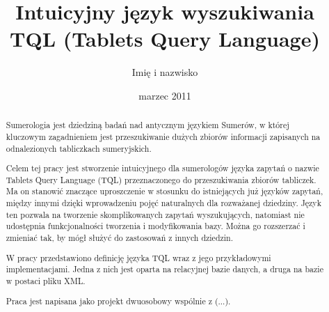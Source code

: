 \documentclass{pracamgr}
\author{Imię i nazwisko}
\title{Intuicyjny język wyszukiwania TQL (Tablets Query Language)}
\date{marzec 2011}
\begin{document}
\maketitle

\begin{abstract}
Sumerologia jest dziedziną badań nad antycznym językiem Sumerów, w której
kluczowym zagadnieniem jest przeszukiwanie dużych zbiorów informacji
zapisanych na odnalezionych tabliczkach sumeryjskich.

Celem tej pracy jest stworzenie intuicyjnego dla sumerologów języka zapytań o nazwie Tablets Query Language (TQL)
 przeznaczonego do przeszukiwania zbiorów tabliczek.
Ma on stanowić znaczące uproszczenie w stosunku do istniejących już języków 
zapytań, między innymi dzięki wprowadzeniu pojęć naturalnych dla rozważanej dziedziny. 
Język ten pozwala na tworzenie skomplikowanych zapytań wyszukujących, natomiast 
nie udostępnia funkcjonalności tworzenia i modyfikowania bazy. 
Można go rozszerzać i zmieniać tak, by mógł służyć do zastosowań z innych 
dziedzin.

W pracy przedstawiono definicję języka TQL wraz z jego przykładowymi implementacjami. 
Jedna z nich jest oparta na relacyjnej bazie danych, a druga na bazie w postaci pliku XML.

Praca jest napisana jako projekt dwuosobowy wspólnie z (...).
\end{abstract}

\tableofcontents












\begin{appendix}


\end{appendix}
\end{document}

